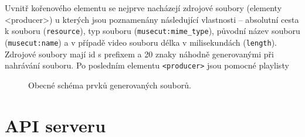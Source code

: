 Uvnitř kořenového elementu se nejprve  nacházejí zdrojové soubory (elementy <producer>) u kterých jsou poznamenány následující vlastnosti -- absolutní cesta k souboru (\texttt{resource}), typ souboru (\texttt{musecut:mime\_type}), původní název souboru (\texttt{musecut:name}) a v případě video souboru délka v milisekundách (\texttt{length}). Zdrojové soubory mají id s prefixem  a 20 znaky náhodně generovanými při nahrávání souboru.
Po posledním elementu \texttt{<producer>} jsou pomocné playlisty
\begin{figure}[h]
	\centering
	\caption{Obecné schéma prvků generovaných souborů.}\label{img:schemaXML}
\end{figure}


\section{API serveru}
